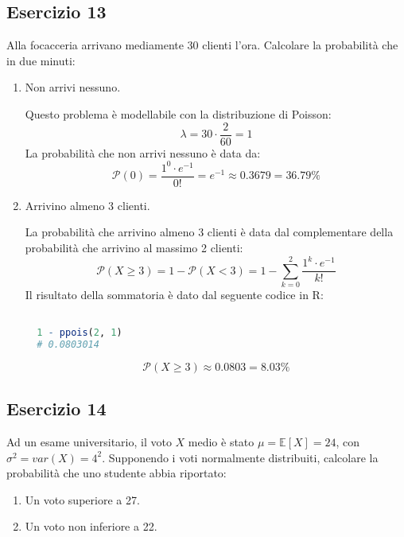 \documentclass[a4paper]{article}
\theoremstyle{break}
\theoremstyle{break}
\theoremstyle{break}
\theoremstyle{break}
\begin{document}
\subsection{Esercizio 13}
Alla focacceria arrivano mediamente 30 clienti l'ora. Calcolare la probabilità che in
due minuti:
\begin{enumerate}
  \item Non arrivi nessuno.

    \vspace{1em}
    Questo problema è modellabile con la distribuzione di Poisson:
    \[
    \lambda = 30 \cdot \frac{2}{60} = 1
    \] 
    La probabilità che non arrivi nessuno è data da:
    \[
    \mathcal{P}(0) = \frac{1^0 \cdot e^{-1}}{0!} = e^{-1} \approx 0.3679 = 36.79\%
    \] 
  \item Arrivino almeno 3 clienti.

    \vspace{1em}
    La probabilità che arrivino almeno 3 clienti è data dal complementare della probabilità
    che arrivino al massimo 2 clienti:
    \[
    \mathcal{P}(X \ge 3) = 1 - \mathcal{P}(X < 3) = 1 - \sum_{k=0}^{2} \frac{1^k \cdot e^{-1}}{k!}
    \]
    Il risultato della sommatoria è dato dal seguente codice in R:
    \begin{lstlisting}[language=R]

  1 - ppois(2, 1)
  # 0.0803014
    \end{lstlisting}
    \[
    \mathcal{P}(X \ge 3) \approx 0.0803 = 8.03\%
    \]
\end{enumerate}

\subsection{Esercizio 14}
Ad un esame universitario, il voto \( X \) medio è stato \( \mu = \mathbb{E}[X] = 24 \),
con \( \sigma^2 = var(X) = 4^2 \). Supponendo i voti normalmente distribuiti, calcolare
la probabilità che uno studente abbia riportato:
\begin{enumerate}
  \item Un voto superiore a 27.
  \item Un voto non inferiore a 22.
\end{enumerate}
\end{document}
